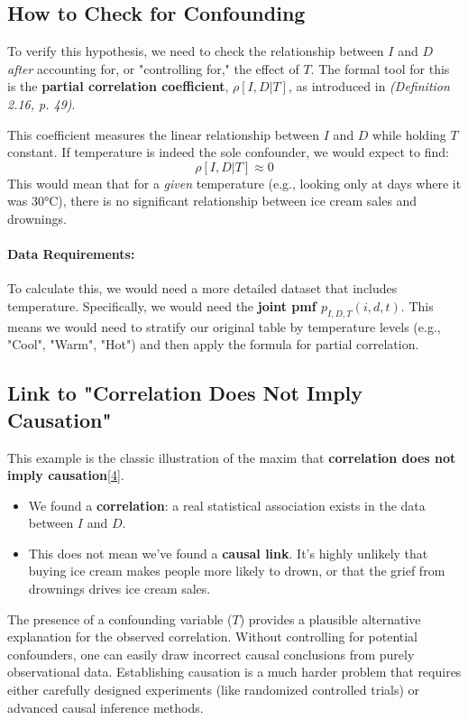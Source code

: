 \documentclass[11pt,a4paper]{article}
\newcommand{\scriptcite}[2]{\textit{(#1, p. #2)}}
\begin{document}
\subsection{How to Check for Confounding}
To verify this hypothesis, we need to check the relationship between $I$ and $D$ \textit{after} accounting for, or "controlling for," the effect of $T$. The formal tool for this is the \textbf{partial correlation coefficient}, $\rho[I, D | T]$, as introduced in \scriptcite{Definition 2.16}{49}.

This coefficient measures the linear relationship between $I$ and $D$ while holding $T$ constant. If temperature is indeed the sole confounder, we would expect to find:
\[ \rho[I, D | T] \approx 0 \]
This would mean that for a \textit{given} temperature (e.g., looking only at days where it was 30°C), there is no significant relationship between ice cream sales and drownings.

\paragraph{Data Requirements:}
To calculate this, we would need a more detailed dataset that includes temperature. Specifically, we would need the \textbf{joint pmf $p_{I,D,T}(i,d,t)$}. This means we would need to stratify our original table by temperature levels (e.g., "Cool", "Warm", "Hot") and then apply the formula for partial correlation.

\subsection{Link to "Correlation Does Not Imply Causation"}
This example is the classic illustration of the maxim that \textbf{correlation does not imply causation}\hyperlink{note4}{[4]}.
\begin{itemize}
    \item We found a \textbf{correlation}: a real statistical association exists in the data between $I$ and $D$.
    \item This does not mean we've found a \textbf{causal link}. It's highly unlikely that buying ice cream makes people more likely to drown, or that the grief from drownings drives ice cream sales.
\end{itemize}
The presence of a confounding variable ($T$) provides a plausible alternative explanation for the observed correlation. Without controlling for potential confounders, one can easily draw incorrect causal conclusions from purely observational data. Establishing causation is a much harder problem that requires either carefully designed experiments (like randomized controlled trials) or advanced causal inference methods.
\end{document}
